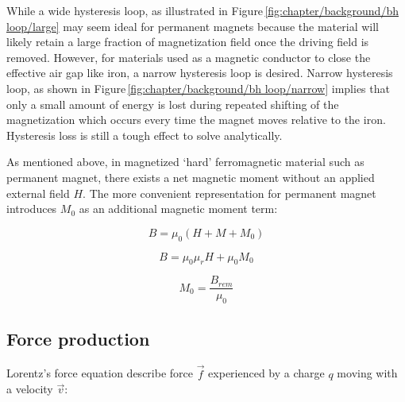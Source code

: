         
        While a wide hysteresis loop, as illustrated in Figure\,\ref{fig:chapter/background/bh loop/large} may seem ideal for permanent magnets because the material will likely retain a large fraction of magnetization field once the driving field is removed. However, for materials used as a magnetic conductor to close the effective air gap like iron, a narrow hysteresis loop is desired. Narrow hysteresis loop, as shown in Figure\,\ref{fig:chapter/background/bh loop/narrow} implies that only a small amount of energy is lost during repeated shifting of the magnetization which occurs every time the magnet moves relative to the iron. Hysteresis loss is still a tough effect to solve analytically.
        
        
        As mentioned above, in magnetized ‘hard’ ferromagnetic material such as permanent magnet, there exists a net magnetic moment without an applied external field $H$. The more convenient representation for permanent magnet introduces $M_0$ as an additional magnetic moment term:


        \begin{equation}
            B = \mu_0 (H + M + M_0)
            \label{eq:B field equation 1}
        \end{equation}   
        
        \begin{equation}
            B = \mu_0 \mu_r H + \mu_0 M_0
            \label{eq:B field equation 2}
        \end{equation}   
        
        \begin{equation}
            M_0 = \frac{B_{rem}}{\mu_0}
            \label{eq:B rem equation}
        \end{equation}  
        
    
    \subsection{Force production}                   \label{Chapter:background/electromagnetic field theory/force production}
    
        Lorentz's force equation describe force $\overrightarrow{f}$ experienced by a charge $q$ moving with a velocity $\overrightarrow{v}$:
        
